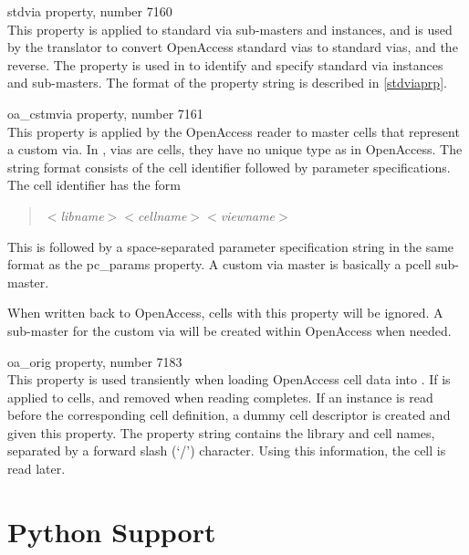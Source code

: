 \begin{description}
\item{\et stdvia} property, number 7160\\
This property is applied to standard via sub-masters and instances,
and is used by the translator to convert OpenAccess standard vias to
{\Xic} standard vias, and the reverse.  The property is used in {\Xic}
to identify and specify standard via instances and sub-masters.  The
format of the property string is described in \ref{stdviaprp}.

\item{\et oa\_cstmvia} property, number 7161\\
This property is applied by the OpenAccess reader to master cells that
represent a custom via.  In {\Xic}, vias are cells, they have no
unique type as in OpenAccess.  The string format consists of the cell
identifier followed by parameter specifications.  The cell identifier
has the form
\begin{quote}
$<${\it libname\/}$><${\it cellname\/}$><${\it viewname\/}$>$
\end{quote}
This is followed by a space-separated parameter specification string
in the same format as the {\et pc\_params} property.  A custom via
master is basically a pcell sub-master.

When written back to OpenAccess, cells with this property will be
ignored.  A sub-master for the custom via will be created within
OpenAccess when needed.

\item{\et oa\_orig} property, number 7183\\
This property is used transiently when loading OpenAccess cell data
into {\Xic}.  If is applied to cells, and removed when reading
completes.  If an instance is read before the corresponding cell
definition, a dummy {\Xic} cell descriptor is created and given this
property.  The property string contains the library and cell names,
separated by a forward slash (`{\vt /}') character.  Using this
information, the cell is read later.
\end{description}

\section{Python Support}
\label{pyplugin}

